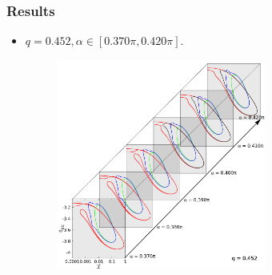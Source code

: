 \documentclass{beamer}
\begin{document}
\begin{frame}
	\frametitle{Results}
	\begin{overlayarea}{\textwidth}{\textheight}
\begin{itemize}
	\item $q=0.452, \alpha\in [0.370\pi, 0.
420\pi]$.
	\begin{figure}[htb]
		\begin{center}
			\includegraphics[width=0.65\textwidth]{plots/elastic_beam_I_theta_q_0.452_alpha_restart3.png}
		\end{center}
	\end{figure}
\end{itemize}
	\end{overlayarea}
\end{frame}

\end{document}
